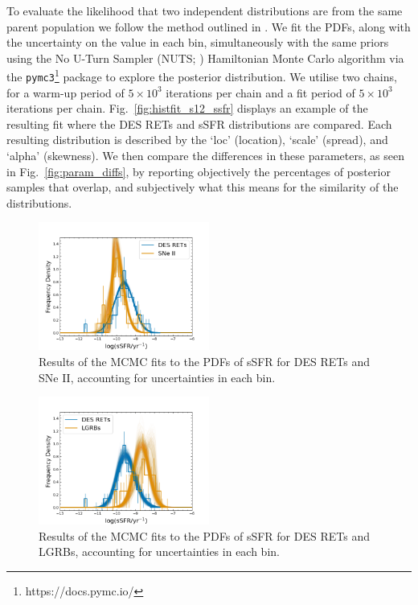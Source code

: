 \documentclass[fleqn,usenatbib,]{mnras}
\begin{document}
To evaluate the likelihood that two independent distributions are from the same parent population we follow the method outlined in . We fit the PDFs, along with the uncertainty on the value in each bin, simultaneously with the same priors using the No U-Turn Sampler (NUTS; \citealt{Hoffman2014}) Hamiltonian Monte Carlo algorithm via the  \texttt{pymc3}\footnote{https://docs.pymc.io/} package to explore the posterior distribution. We utilise two chains, for a warm-up period of $5\times10^3$ iterations per chain and a fit period of $5\times10^3$ iterations per chain. Fig.~\ref{fig:histfit_s12_ssfr} displays an example of the resulting fit where the DES RETs and \citet{Sanders2012} sSFR distributions are compared. Each resulting distribution is described by the `loc' (location), `scale' (spread), and `alpha' (skewness). We then compare the differences in these parameters, as seen in Fig.~\ref{fig:param_diffs}, by reporting objectively the percentages of posterior samples that overlap, and subjectively what this means for the similarity of the distributions.
\twocolumn
\begin{figure}
\includegraphics[width=0.5\textwidth]{mc_figs/rets_s13_histfit_ssfr_final.png}
\caption{Results of the MCMC fits to the PDFs of sSFR for DES RETs and SNe II, accounting for uncertainties in each bin.
\label{fig:histfit_ssfr_s13}}
\end{figure}
\begin{figure}
\includegraphics[width=0.5\textwidth]{mc_figs/rets_k15_histfit_ssfr_final.png}
\caption{Results of the MCMC fits to the PDFs of sSFR for DES RETs and LGRBs, accounting for uncertainties in each bin.
\label{fig:histfit_ssfr_k15}}
\end{figure}
\end{document}
